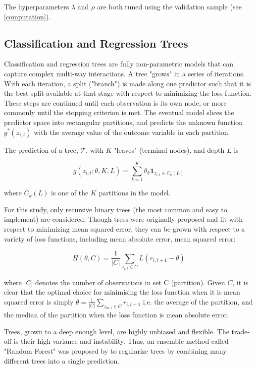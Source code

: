 \documentclass[a4paper, table]{article}
\begin{document}
The hyperparameters $\lambda$ and $\rho$ are both tuned using the validation sample (see \ref{computation}). 

\subsection{Classification and Regression Trees}

Classification and regression trees are fully non-parametric models that can capture complex multi-way interactions. A tree "grows" in a series of iterations. With each iteration, a split ("branch") is made along one predictor such that it is the best split available at that stage with respect to minimizing the loss function. These steps are continued until each observation is its own node, or more commonly until the stopping criterion is met. The eventual model slices the predictor space into rectangular partitions, and predicts the unknown function $g^*(z_{i,t})$ with the average value of the outcome variable in each partition.

The prediction of a tree, $\mathcal{T}$, with \(K\) "leaves" (terminal nodes), and depth $L$ is

\begin{equation}
	g(z_{i,t};\theta,K,L) = \sum_{k=1}^{K}\theta_k\textbf{1}_{z_{i,t}\in C_k(L)}
\end{equation}

where $C_k(L)$ is one of the $K$ partitions in the model.

For this study, only recursive binary trees (the most common and easy to implement) are considered. Though trees were originally proposed and fit with respect to minimizing mean squared error, they can be grown with respect to a variety of loss functions, including mean absolute error, mean squared error:

\begin{equation}
	H(\theta, C) = \frac{1}{|C|} \sum_{z_{i,t} \in C} L(r_{i,t+1} - \theta)
\end{equation}

where $|C|$ denotes the number of observations in set C (partition). Given $C$, it is clear that the optimal choice for minimising the loss function when it is mean squared error is simply $\theta = \frac{1}{|C|} \sum_{z_{io,t}\in C}^{ }r_{i,t+1}$ i.e. the average of the partition, and the median of the partition when the loss function is mean absolute error.

Trees, grown to a deep enough level, are highly unbiased and flexible. The trade-off is their high variance and instability. Thus, an ensemble method called "Random Forest" was proposed by \cite{breiman_random_2001} to regularize trees by combining many different trees into a single prediction.
\end{document}
